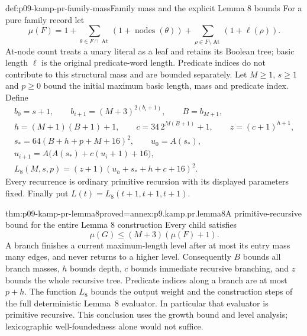 \begin{hbdefinition}{def:p09-kamp-pr-family-mass}{Family mass and the explicit Lemma 8 bounds}
For a pure family record let
\[
 \mu(F)=1+\sum_{\theta\in F\cap\operatorname{At}}
                      (1+\operatorname{nodes}(\theta))
             +\sum_{\rho\in F\setminus\operatorname{At}}(1+\ell(\rho)).
\]
At-node count treats a unary literal as a leaf and retains its Boolean
tree; basic length \(\ell\) is the original predicate-word length.
Predicate indices do not contribute to this structural mass and are
bounded separately. Let \(M\geq1\), \(s\geq1\) and \(p\geq0\)
bound the initial maximum basic length, mass and predicate index.
Define
\[
\begin{gathered}
 b_0=s+1,\qquad b_{i+1}=(M+3)^{2(b_i+1)},\qquad B=b_{M+1},\\
 h=(M+1)(B+1)+1,\qquad
 c=34\,2^{M(B+1)}+1,\qquad z=(c+1)^{h+1},\\
 s_*=64(B+h+p+M+16)^2,\qquad u_0=A(s_*),\\
 u_{i+1}=A\bigl(A(s_*)+c(u_i+1)+16\bigr),\\
 L_8(M,s,p)=(z+1)(u_h+s_*+h+c+16)^2.
\end{gathered}
\]
Every recurrence is ordinary primitive recursion with its displayed
parameters fixed. Finally put \(L(t)=L_8(t+1,t+1,t+1)\).
\end{hbdefinition}

\begin{hblemma}{thm:p09-kamp-pr-lemma8}{proved=annex:p9.kamp.pr.lemma8}{A primitive-recursive bound for the entire Lemma 8 construction}
Every child satisfies
\[
                    \mu(G)\leq(M+3)(\mu(F)+1).
\]
A branch finishes a current maximum-length level after at most its
entry mass many edges, and never returns to a higher level. Consequently
\(B\) bounds all branch masses, \(h\) bounds depth, \(c\)
bounds immediate recursive branching, and \(z\) bounds the whole
recursive tree. Predicate indices along a branch are at most \(p+h\).
The function \(L_8\) bounds the output weight and the construction
steps of the full deterministic Lemma~8 evaluator. In particular that
evaluator is primitive recursive. This conclusion uses the growth bound
and level analysis; lexicographic well-foundedness alone would not suffice.
\end{hblemma}

